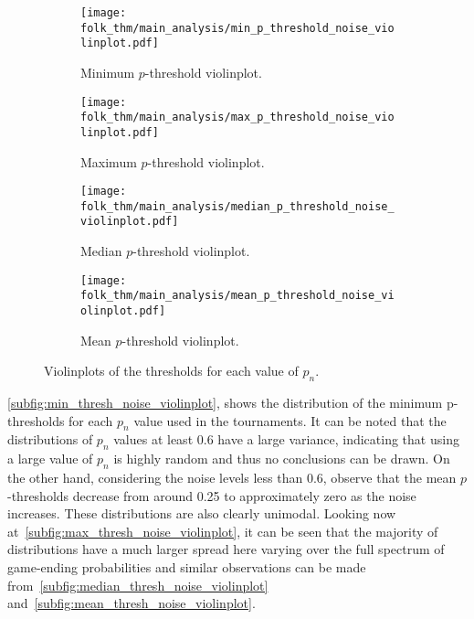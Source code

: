 \begin{figure}
    \begin{subfigure}{0.45\textwidth}
        \centering
        \texttt{[image: folk\_thm/main\_analysis/min\_p\_threshold\_noise\_violinplot.pdf]}
        \caption{Minimum \(p\)-threshold violinplot.}\label{subfig:min_thresh_noise_violinplot}
    \end{subfigure}
    \begin{subfigure}{0.45\textwidth}
        \centering
        \texttt{[image: folk\_thm/main\_analysis/max\_p\_threshold\_noise\_violinplot.pdf]}
        \caption{Maximum \(p\)-threshold violinplot.}\label{subfig:max_thresh_noise_violinplot}
    \end{subfigure}

    \begin{subfigure}{0.45\textwidth}
        \centering
        \texttt{[image: folk\_thm/main\_analysis/median\_p\_threshold\_noise\_violinplot.pdf]}
        \caption{Median \(p\)-threshold violinplot.}\label{subfig:median_thresh_noise_violinplot}
    \end{subfigure}
    \begin{subfigure}{0.45\textwidth}
        \centering
        \texttt{[image: folk\_thm/main\_analysis/mean\_p\_threshold\_noise\_violinplot.pdf]}
        \caption{Mean \(p\)-threshold violinplot.}\label{subfig:mean_thresh_noise_violinplot}
    \end{subfigure}
    \caption{Violinplots of the thresholds for each value of \(p_{n}\).}\label{fig:noise_p_thresh_violinplot}
\end{figure}

\autoref{subfig:min_thresh_noise_violinplot}, shows the distribution of the
minimum p-thresholds for each \(p_{n}\) value used in the
tournaments. It can be noted that the distributions of \(p_{n}\) values at
least 0.6 have a large variance, indicating that using a large value of
\(p_{n}\) is highly random and thus no conclusions can be drawn. On the
other hand, considering the noise levels less than 0.6, observe that the mean
\(p\)-thresholds decrease from around 0.25 to approximately zero as the noise
increases. These distributions are also clearly unimodal. Looking now at~\autoref{subfig:max_thresh_noise_violinplot}, it can be seen that the
majority of distributions have a much larger spread here varying over the full
spectrum of game-ending probabilities and similar observations can be made from~\autoref{subfig:median_thresh_noise_violinplot}
and~\autoref{subfig:mean_thresh_noise_violinplot}. 

